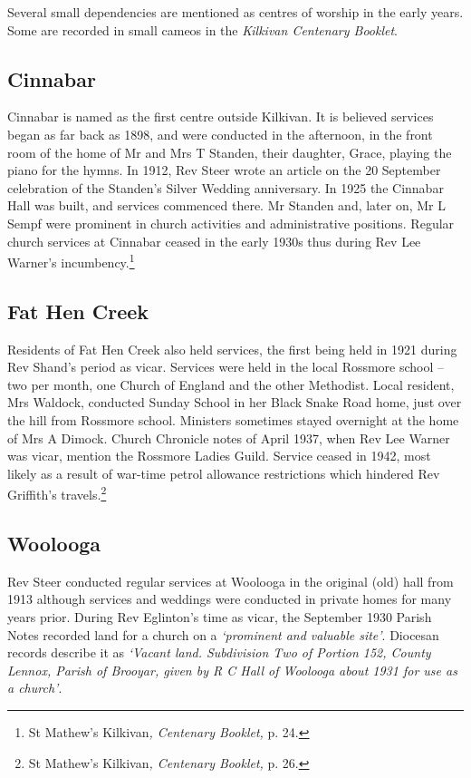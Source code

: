 Several small dependencies are mentioned as centres of worship in the early years. Some are recorded in small cameos in the \emph{Kilkivan Centenary Booklet}.

\hypertarget{cinnabar}{%
\subsection{Cinnabar}\label{cinnabar}}

Cinnabar is named as the first centre outside Kilkivan. It is believed services began as far back as 1898, and were conducted in the afternoon, in the front room of the home of Mr and Mrs T Standen, their daughter, Grace, playing the piano for the hymns. In 1912, Rev Steer wrote an article on the 20 September celebration of the Standen's Silver Wedding anniversary. In 1925 the Cinnabar Hall was built, and services commenced there. Mr Standen and, later on, Mr L Sempf were prominent in church activities and administrative positions. Regular church services at Cinnabar ceased in the early 1930s thus during Rev Lee Warner's incumbency.\footnote{St Mathew's Kilkivan\emph{, Centenary Booklet,} p. 24.}

\hypertarget{fat-hen-creek}{%
\subsection{Fat Hen Creek}\label{fat-hen-creek}}

Residents of Fat Hen Creek also held services, the first being held in 1921 during Rev Shand's period as vicar. Services were held in the local Rossmore school -- two per month, one Church of England and the other Methodist. Local resident, Mrs Waldock, conducted Sunday School in her Black Snake Road home, just over the hill from Rossmore school. Ministers sometimes stayed overnight at the home of Mrs A Dimock. Church Chronicle notes of April 1937, when Rev Lee Warner was vicar, mention the Rossmore Ladies Guild. Service ceased in 1942, most likely as a result of war-time petrol allowance restrictions which hindered Rev Griffith's travels.\footnote{St Mathew's Kilkivan\emph{, Centenary Booklet,} p. 26.}

\hypertarget{woolooga}{%
\subsection{Woolooga}\label{woolooga}}

Rev Steer conducted regular services at Woolooga in the original (old) hall from 1913 although services and weddings were conducted in private homes for many years prior. During Rev Eglinton's time as vicar, the September 1930 Parish Notes recorded land for a church on a \emph{`prominent and valuable site'}. Diocesan records describe it as \emph{`Vacant land. Subdivision Two of Portion 152, County Lennox, Parish of Brooyar, given by R C Hall of Woolooga about 1931 for use as a church'}.

